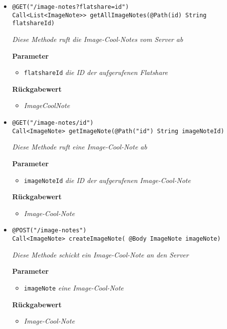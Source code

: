 		\begin{itemize}
		\item\texttt{{@GET("/image-notes?flatshare={id}")\\
Call<List<ImageNote>> getAllImageNotes(@Path(\grqq id\grqq) String flatshareId)}}

		\textit{Diese Methode ruft die Image-Cool-Notes vom Server ab}

		\textbf{Parameter} 
			\begin{itemize}
				\item\texttt{flatshareId}
		 		\textit{die ID der aufgerufenen Flatshare}
	 		\end{itemize}

		\textbf{Rückgabewert} 
		\begin{itemize}
		\item\textit{ImageCoolNote}
		\end{itemize}
		
      \item\texttt{{@GET("/image-notes/{id}")\\ Call<ImageNote> getImageNote(@Path("\grqq id\grqq") String imageNoteId)}}

		\textit{Diese Methode ruft eine Image-Cool-Note ab }

		\textbf{Parameter} 
			\begin{itemize}
				\item\texttt{imageNoteId}
		 		\textit{die ID der aufgerufenen Image-Cool-Note}
	 		\end{itemize}

		\textbf{Rückgabewert} 
		\begin{itemize}
		\item\textit{Image-Cool-Note}
		\end{itemize}
		

	\item\texttt{{@POST("/image-notes")\\ Call<ImageNote> createImageNote( @Body ImageNote imageNote)}}

		\textit{Diese Methode schickt ein Image-Cool-Note an den Server}

		\textbf{Parameter} 
			\begin{itemize}
				\item\texttt{imageNote}
		 		\textit{eine Image-Cool-Note}
	 		\end{itemize}

		\textbf{Rückgabewert} 
		\begin{itemize}
		\item\textit{Image-Cool-Note}
		\end{itemize}



\end{itemize}
